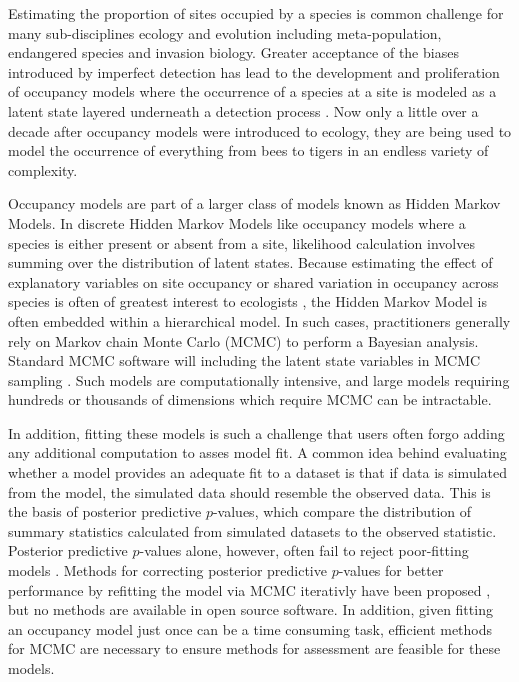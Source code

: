 \documentclass[12pt]{article}
\begin{document}
Estimating the proportion of sites occupied by a species is common
challenge for many sub-disciplines ecology and evolution including
meta-population, endangered species and invasion biology. Greater
acceptance of the biases introduced by imperfect detection has lead to
the development and proliferation of occupancy models where the
occurrence of a species at a site is modeled as a latent state layered
underneath a detection process \citep[e.g.,][]{mackenzie-2006,
  royle-2007-1813}. Now only a little over a decade after occupancy
models were introduced to ecology, they are being used to model the
occurrence of everything from bees \citep{mgonigle-2015-x} to tigers
\citep{hines2010tigers} in an endless variety of complexity.

Occupancy models are part of a larger class of models known as Hidden
Markov Models. In discrete Hidden Markov Models like occupancy models
where a species is either present or absent from a site, likelihood
calculation involves summing over the distribution of latent
states. Because estimating the effect of explanatory variables on site
occupancy or shared variation in occupancy across species is often of
greatest interest to ecologists \citep[e.g.,][]{iknayan2014detecting},
the Hidden Markov Model is often embedded within a hierarchical
model. In such cases, practitioners generally rely on Markov chain
Monte Carlo (MCMC) to perform a Bayesian analysis. Standard MCMC
software will including the latent state variables in MCMC sampling
\citep[e.g.,][]{plummer-2003-jags, winbugs, openbugs}. Such models are
computationally intensive, and large models requiring hundreds or
thousands of dimensions which require MCMC can be intractable.

In addition, fitting these models is such a challenge that users often
forgo adding any additional computation to asses model fit. A common
idea behind evaluating whether a model provides an adequate fit to a
dataset is that if data is simulated from the model, the simulated
data should resemble the observed data. This is the basis of posterior
predictive $p$-values, which compare the distribution of summary
statistics calculated from simulated datasets to the observed
statistic. Posterior predictive $p$-values alone, however, often fail
to reject poor-fitting models \citep{bayarri-berger-00,
  robins-etal-00, hjort-etal-06}. Methods for correcting posterior
predictive $p$-values for better performance by refitting the model
via MCMC iterativly have been proposed \citep[e.g., calibrated
posterior predictive $p$-values, ][]{hjort-etal-06}, but no methods
are available in open source software. In addition, given fitting an
occupancy model just once can be a time consuming task, efficient
methods for MCMC are necessary to ensure methods for assessment are
feasible for these models.
\end{document}
